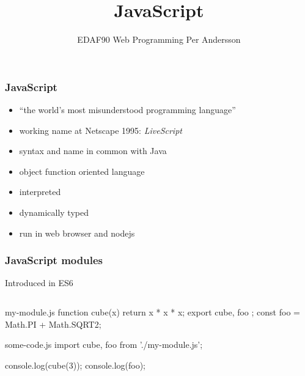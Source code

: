 \documentclass[aspectratio=1610]{beamer}
\title[JavaScript]{JavaScript}
\author[EDAF90]{%
  EDAF90 Web Programming\newline
  Per Andersson}
\begin{document}
\begin{frame}[plain]%
  \titlepage
\end{frame}

\begin{frame}
  \frametitle{JavaScript}

\begin{itemize}
\item ``the world's most misunderstood programming language''
\item working name at Netscape 1995: \emph{LiveScript}
\item syntax and name in common with Java
\item object function oriented language
\item interpreted
\item dynamically typed 
\item run in web browser and nodejs
\end{itemize}

\end{frame}









\begin{frame}[fragile]
  \frametitle{JavaScript modules}
  Introduced in ES6
\begin{columns}[onlytextwidth]
  \begin{column}{1\textwidth}
\begin{CodeBox}{my-module.js}
function cube(x) {
  return x * x * x;
}
export { cube, foo };
const foo = Math.PI + Math.SQRT2;
\end{CodeBox}
\begin{CodeBox}{some-code.js}
import { cube, foo } from './my-module.js';

console.log(cube(3));
console.log(foo);
\end{CodeBox}
  \end{column}
\end{columns}%
\end{frame}
\end{document}
